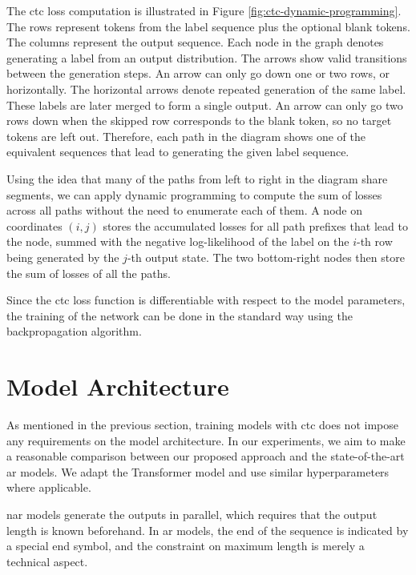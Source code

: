 The \ac{ctc} loss computation is illustrated in Figure
\ref{fig:ctc-dynamic-programming}. The rows represent tokens from the label
sequence plus the optional blank tokens. The columns represent the output
sequence.  Each node in the graph denotes generating a label from an output
distribution. The arrows show valid transitions between the generation
steps. An arrow can only go down one or two rows, or horizontally.  The
horizontal arrows denote repeated generation of the same label. These labels
are later merged to form a single output. An arrow can only go two rows down
when the skipped row corresponds to the blank token, so no target tokens are
left out. Therefore, each path in the diagram shows one of the equivalent
sequences that lead to generating the given label sequence.

Using the idea that many of the paths from left to right in the diagram share
segments, we can apply dynamic programming to compute the sum of losses across
all paths without the need to enumerate each of them. A node on coordinates
$(i,j)$ stores the accumulated losses for all path prefixes that lead to the
node, summed with the negative log-likelihood of the label on the $i$-th row
being generated by the $j$-th output state. The two bottom-right nodes then
store the sum of losses of all the paths.

Since the \ac{ctc} loss function is differentiable with respect to the model
parameters, the training of the network can be done in the standard way using
the backpropagation algorithm.

\section{Model Architecture}
\label{sec:ctc:arch}

As mentioned in the previous section, training models with \ac{ctc} does not
impose any requirements on the model architecture. In our experiments, we aim
to make a reasonable comparison between our proposed approach and the
state-of-the-art \acl{ar} models. We adapt the Transformer model and use
similar hyperparameters where applicable.

\Acl{nar} models generate the outputs in parallel, which requires that the
output length is known beforehand. In \acl{ar} models, the end of the sequence
is indicated by a special end symbol, and the constraint on maximum length is
merely a technical aspect.

